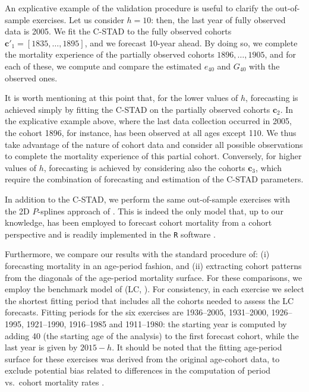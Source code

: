 \documentclass[11pt, a4paper]{article}
\begin{document}
An explicative example of the validation procedure is useful to clarify the out-of-sample exercises. Let us consider $h=10$: then, the last year of fully observed data is 2005. We fit the C-STAD to the fully observed cohorts {\color{red}$\bm{c}'_1=\left[1835,\dots,1895\right]$}, and we forecast 10-year ahead. By doing so, we complete the mortality experience of the partially observed cohorts $1896,\ldots,1905$, and for each of these, we compute and compare the estimated $e_{40}$ and $G_{40}$ with the observed ones. 

It is worth mentioning at this point that, for the lower values of $h$, forecasting is achieved simply by fitting the C-STAD on the partially observed cohorts $\bm{c}_2$. In the explicative example above, where the last data collection occurred in 2005, the cohort 1896, for instance, has been observed at all ages except 110. We thus take advantage of the nature of cohort data and consider all possible observations to complete the mortality experience of this partial cohort.  Conversely, for higher values of $h$, forecasting is achieved by considering also the cohorts $\bm{c}_3$, which require the combination of forecasting and estimation of the C-STAD parameters. 

In addition to the C-STAD, we perform the same out-of-sample exercises with the 2D $P$-splines approach of \cite{currie2004smoothing}. This is indeed the only model that, up to our knowledge, has been employed to forecast cohort mortality from a cohort perspective \citep{cmi2007stochastic} and is readily implemented in the \texttt{R} software \cite[in the \texttt{MortalitySmooth} package,][]{camarda2012mortalitysmooth}. 

{\color{red} Furthermore, we compare our results with the standard procedure of: (i) forecasting mortality in an age-period fashion, and (ii) extracting cohort patterns from the diagonals of the age-period mortality surface. For these comparisons, we employ the benchmark model of \citeauthor{lee1992modeling} (LC, \citeyear{lee1992modeling}). For consistency, in each exercise we select the shortest fitting period that includes all the cohorts needed to assess the LC forecasts. Fitting periods for the six exercises are 1936--2005, 1931--2000, 1926--1995, 1921--1990, 1916--1985 and 1911--1980: the starting year is computed by adding 40 (the starting age of the analysis) to the first forecast cohort, while the last year is given by $2015 - h$. It should be noted that the fitting age-period surface for these exercises was derived from the original age-cohort data, to exclude potential bias related to differences in the computation of period vs.~cohort mortality rates \cite[see][pp.~29--33]{wilmoth2017protocol}. \par
}
\end{document}
